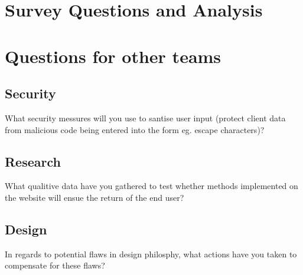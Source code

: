 \documentclass[letterpaper,12pt]{article}
\begin{document}
\section{Survey Questions and Analysis}

 \begin{bchart}[step=15,max=100,width=12cm]
 \end{bchart}

\section{Questions for other teams}

\subsection{ Security}

What security messures will you use to santise user input (protect client data from malicious code being entered into the form eg. escape characters)?

\subsection{Research}

What qualitive data have you gathered to test whether methods implemented on the website will ensue the return of the end user?

\subsection {Design}

In regards to potential flaws in design philosphy, what actions have you taken to compensate for these flaws?



\appendix
\printindex
{}
\printglossaries

\end{document}
